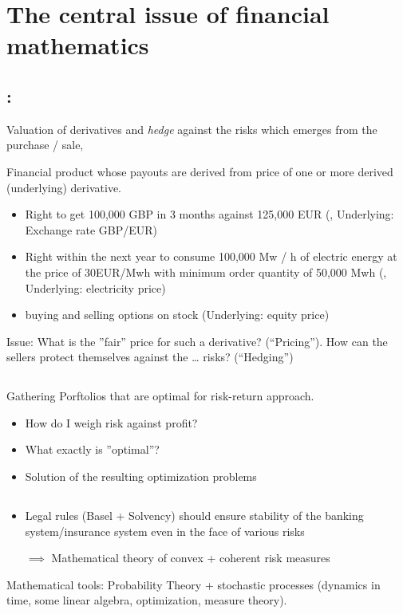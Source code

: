 \section{The central issue of financial mathematics}
\subsection*{:}
Valuation of derivatives and \emph{hedge} against the risks which emerges from the purchase / sale,

\begin{*definition}
	Financial product whose payouts are derived from price of one or more  derived (underlying) derivative.
\end{*definition}
\begin{*example}
	\begin{itemize}
		\item Right to get 100,000 GBP in 3 months against 125,000 EUR (, Underlying: Exchange rate GBP/EUR)
		\item Right within the next year to consume 100,000 Mw / h of electric energy at the price of 30EUR/Mwh with minimum order quantity of 50,000 Mwh (, Underlying: electricity price)
		\item buying and selling options on stock (Underlying: equity price)
	\end{itemize}
\end{*example}
Issue:  What is the ''fair'' price for such a derivative? (``Pricing''). How can the sellers protect themselves against the … risks? (``Hedging'')

\subsection*{}
Gathering Porftolios that are optimal for risk-return approach.
\begin{itemize}
	\item How do I weigh risk against profit?
	\item What exactly is ''optimal''?
	\item Solution of the resulting optimization problems
\end{itemize}
\subsection*{}
\begin{itemize}
	
	\item Legal rules (Basel + Solvency) should ensure stability of the banking system/insurance system even in the face of various risks 
	
	$\implies$ Mathematical theory of convex + coherent risk measures 
\end{itemize}	 
Mathematical tools: Probability Theory + stochastic processes (dynamics in time, some linear algebra, optimization, measure theory).

